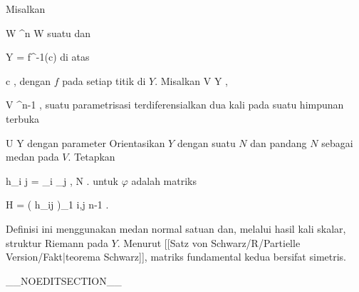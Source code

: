 {}
{

Misalkan

\mavergleichskette
{\vergleichskette
{ W
}
{ \subseteq }{ \R^n
}
{  }{
}
{    }{
}
{   }{
}
}
{}{}{}
 { W } { \R
} {}
suatu
dan

\mavergleichskette
{\vergleichskette
{ Y
}
{ = }{ f^{-1}(c)
}
{  }{
}
{    }{
}
{   }{
}
}
{}{}{}
di atas

\mavergleichskette
{\vergleichskette
{ c
}
{ \in }{ \R
}
{  }{
}
{    }{
}
{   }{
}
}
{}{}{,}
dengan $f$
pada setiap titik di $Y$. Misalkan
\maabbdisp {\varphi} { V } { Y
} {,}

\mavergleichskette
{\vergleichskette
{ V
}
{ \subseteq }{ \R^{n-1}
}
{  }{
}
{    }{
}
{   }{
}
}
{}{}{,}
suatu parametrisasi terdiferensialkan dua kali pada suatu himpunan terbuka

\mavergleichskette
{\vergleichskette
{ U
}
{ \subseteq }{ Y
}
{  }{
}
{    }{
}
{   }{
}
}
{}{}{}
dengan parameter
 Orientasikan $Y$ dengan suatu
$N$
dan pandang $N$ sebagai medan pada $V$. Tetapkan

\mavergleichskettedisp
{\vergleichskette
{ h_{i j}
}
{ =} { \left\langle  \partial_i \partial_j \varphi , N  \right\rangle
}
{ } {
}
{ } {
}
{ } {
}
}
{}{}{.}
untuk $\varphi$ adalah matriks
 {} {}

\mavergleichskettedisp
{\vergleichskette
{ H
}
{ =} { \left(  h_{ij}   \right)_{1 \leq i,j \leq n-1}
}
{ } {
}
{ } {
}
{ } {
}
}
{}{}{.}

}

Definisi ini menggunakan medan normal satuan dan, melalui hasil kali skalar, struktur Riemann pada $Y$. Menurut
[[Satz von Schwarz/R/Partielle Version/Fakt|teorema Schwarz]],
matriks fundamental kedua bersifat simetris.

__NOEDITSECTION__

